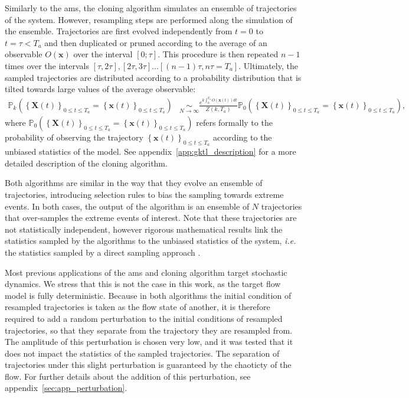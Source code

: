 \documentclass{jfm}
\begin{document}
Similarly to the \ac{ams}, the cloning algorithm simulates an ensemble of trajectories of the system.
However, resampling steps are performed along the simulation of the ensemble.
Trajectories are first evolved independently from $t = 0$ to $t=\tau < T_a$ and then duplicated or pruned
according to the average of an observable $O(\mathbf{x})$ over the interval $[0;\tau]$.
This procedure is then repeated $n-1$ times over the intervals $[\tau, 2\tau], [2\tau, 3\tau]... [(n-1)\tau, n\tau = T_a]$.
Ultimately, the sampled trajectories are distributed according to a probability distribution that is tilted towards large values of the average observable:
\begin{align}
\mathbb{P}_{k}\left(\left\{ \mathbf{X}(t)\right\} _{0\leq t\leq T_{a}}=\left\{ \mathbf{x}(t)\right\} _{0\leq t\leq T_{a}}\right) &\underset{N\rightarrow\infty}{\sim} \frac{e^{k\int_{0}^{T_{a}}O(\mathbf{x}(t))dt}}{Z(k,T_a)}\mathbb{\mathbb{P}}_{0}\left(\left\{ \mathbf{X}(t)\right\} _{0\leq t\leq T_{a}}=\left\{ \mathbf{x}(t)\right\} _{0\leq t\leq T_{a}}\right),
\label{eq:Biased_Path_Approximation_main}
\end{align}
where
$\mathbb{P}_{0}\left(\left\{ \mathbf{X}(t)\right\} _{0\leq t\leq T_{a}} = \left\{ \mathbf{x}(t)\right\} _{0\leq t\leq T_{a}}\right)$ refers formally to the probability of observing the trajectory
$\left\{ \mathbf{x}(t)\right\} _{0\leq t\leq T_{a}}$ according to the unbiased statistics of the model.
See appendix~\ref{app:gktl_description} for a more detailed description of the cloning algorithm.

Both algorithms are similar in the way that they evolve an ensemble of trajectories, introducing selection
rules to bias the sampling towards extreme events.
In both cases, the output of the algorithm is an ensemble of $N$ trajectories that over-samples the extreme
events of interest.
Note that these trajectories are not statistically independent, however rigorous mathematical results link the statistics sampled by the algorithms to the unbiased statistics of the system, \textit{i.e.} the statistics sampled by a direct sampling approach \citep{DelMoral2013, brehier:hal-01142704}.

Most previous applications of the \ac{ams} and cloning algorithm target stochastic dynamics.
We stress that this is not the case in this work, as the target flow model is fully deterministic.
Because in both algorithms the initial condition of resampled trajectories is taken as the flow state of another, it is therefore required to add a random perturbation to the initial conditions of resampled trajectories, so that they separate from the trajectory they are resampled from.
The amplitude of this perturbation is chosen very low, and it was tested that it does not impact the statistics of the sampled trajectories.
The separation of trajectories under this slight perturbation is guaranteed by the chaoticty of the flow.
For further details about the addition of this perturbation, see appendix~\ref{sec:app_perturbation}.
\end{document}

